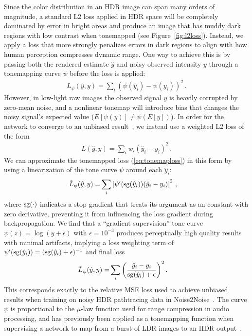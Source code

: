 Since the color distribution in an HDR image can span many orders of magnitude, a standard L2 loss applied in HDR space will be completely dominated by error in bright areas and produce an image that has muddy dark regions with low contrast when tonemapped (see  Figure~\ref{fig:l2loss}).
Instead, we apply a loss that more strongly penalizes errors in dark regions to align with how human perception compresses dynamic range. One way to achieve this is by passing both the rendered estimate $\hat y$ and noisy observed intensity $y$ through a tonemapping curve $\psi$ before the loss is applied:
\begin{align}
    L_\psi(\hat y, y) = \sum_i (\psi(\hat y_i) - \psi(y_i))^2\, .
    \label{eq:tonemaploss}
\end{align}
However, in low-light raw images the observed signal $y$ is heavily corrupted by zero-mean noise, and a nonlinear tonemap will introduce bias that changes the noisy signal's expected value ($E[\psi(y)] \neq \psi(E[y])$). In order 
for the network to converge to an unbiased result~\cite{lehtinen2018}, 
we instead use a weighted L2 loss of the form
\begin{align}
    L(\hat y, y) = \sum_i w_i (\hat y_i - y_i)^2\,  .
\end{align}
We can approximate the tonemapped loss (\ref{eq:tonemaploss}) in this form by using a linearization of the tone curve $\psi$ around each $\hat y_i$:
\begin{align}
   \tilde L_{\psi}(\hat y, y) = &\sum_i \left[\psi'(\mathrm{sg}(\hat y_i))(\hat y_i - y_i) \right]^2 \, ,
\end{align}
where $\mathrm{sg}(\cdot )$ indicates a stop-gradient that treats its argument as an constant with zero derivative, preventing it from influencing the loss gradient during backpropagation.
We find that a ``gradient supervision'' tone curve $\psi(z) = \log(y + \epsilon)$ with $\epsilon=10^{-3}$ produces perceptually high quality results with minimal artifacts, implying a loss weighting term of $\psi'(\mathrm{sg}(\hat y_i)) = (\mathrm{sg}(\hat y_i) + \epsilon )^{-1}$ and final loss
\begin{align}
\label{eq:loss}
    \tilde L_{\psi}(\hat y, y) = &\sum_i \left(\frac{\hat y_i - y_i}{\mathrm{sg}(\hat y_i) + \epsilon} \right)^2 .
\end{align}
This corresponds exactly to the relative MSE loss used to achieve unbiased results when training on noisy HDR pathtracing data in Noise2Noise~\cite{lehtinen2018}. The curve $\psi$ is proportional to the $\mu$-law function used for range compression in audio processing, and has previously been applied as a tonemapping function when supervising a network to map from a burst of LDR images to an HDR output~\cite{kalantari2017hdr}. 


